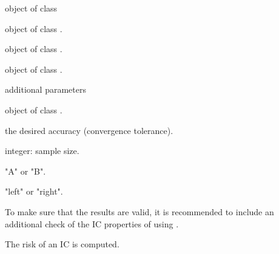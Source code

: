 \begin{Arguments}
\begin{ldescription}
\item[\code{IC}] object of class  
\item[\code{risk}] object of class . 
\item[\code{neighbor}] object of class . 
\item[\code{L2Fam}] object of class . 
\item[\code{...}] additional parameters 
\item[\code{biastype}] object of class . 
\item[\code{tol}] the desired accuracy (convergence tolerance).
\item[\code{sampleSize}] integer: sample size. 
\item[\code{Algo}] "A" or "B". 
\item[\code{cont}] "left" or "right". 
\end{ldescription}
\end{Arguments}
\begin{Details}\relax
To make sure that the results are valid, it is recommended
to include an additional check of the IC properties of  
using .
\end{Details}
\begin{Value}
The risk of an IC is computed.
\end{Value}
